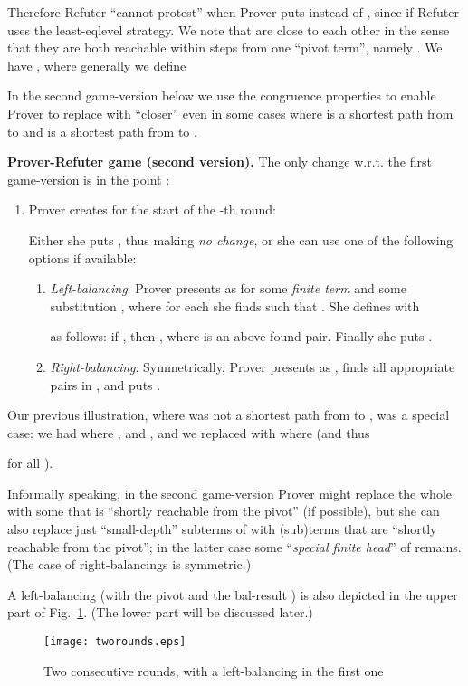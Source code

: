 \documentclass{llncs}
\begin{document}
Therefore Refuter ``cannot protest'' when Prover puts
 instead of 
, since
 if Refuter uses the
least-eqlevel strategy.
We note that  are close to each other in the
sense that they are both reachable within  steps from one
``pivot term'', namely . 
We have , where generally we define 

In the second game-version below
we use the congruence properties
to enable
Prover to replace  with ``closer''
 even in some cases where  is
a shortest path from  to  and 
 is a shortest path from  to .


\smallskip

\textbf{Prover-Refuter game (second version).}
The only change w.r.t. the first game-version is in the
 point :
\begin{enumerate}[3.]
\item
	Prover creates  for the start of the 
	-th round:

	Either she puts ,
	thus making \emph{no change}, 
	or she can use one of the following options if available:
	\begin{enumerate}[i/]
		\item \emph{Left-balancing}:
Prover presents  as  for some \emph{finite
term}  and some substitution ,
where for each
 she finds  such that 
.
She defines  with 

as follows: if , then
, where  is an above found pair.
Finally she  puts 
.
\item
\emph{Right-balancing}:	
Symmetrically, Prover presents  as , 
finds all appropriate pairs
 in , 
and puts . 
\end{enumerate}
\end{enumerate}
Our previous illustration, where  
was not a shortest path from  to ,
was a special case:
we had  where ,  and 
, and we replaced  with 
 where  (and thus 

for all ).

Informally speaking, in the second game-version
Prover might replace the whole  with some  that
is ``shortly reachable from the pivot'' (if possible),
but she can also replace just
``small-depth'' subterms  of  with (sub)terms  that are
``shortly reachable from the pivot''; in the latter case some
``\emph{special finite head}''  of  remains. (The case of
right-balancings is symmetric.)

A left-balancing (with the pivot  and the bal-result 
)
is also depicted in the upper part of
Fig.~\ref{fig:tworounds}. (The lower part will be discussed later.)


\begin{figure}\centering
\texttt{[image: tworounds.eps]}
\caption{Two consecutive rounds, with a left-balancing in the first
one}
\label{fig:tworounds}
\end{figure}
\end{document}
